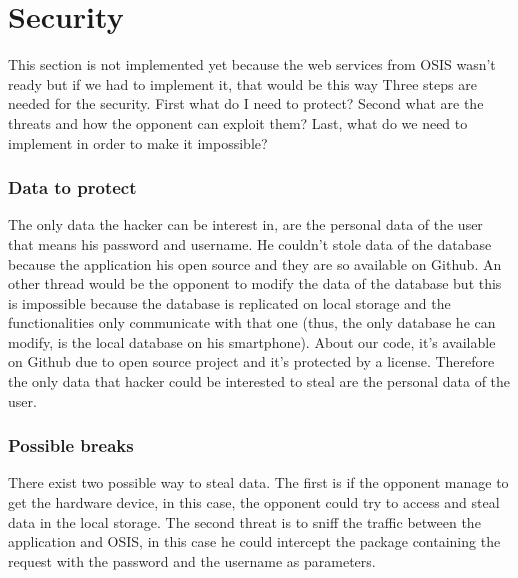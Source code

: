 \documentclass[11pt, a4paper]{report}
\begin{document}
\section{Security}

This section is not implemented yet because the web services from OSIS wasn't ready but if we had to implement it, that would be this way
Three steps are needed for the security. First what do I need to protect? Second what are the threats and how the opponent can exploit them? Last, what do we need to implement in order to make it impossible? 

\subsubsection{Data to protect}
The only data the hacker can be interest in, are the personal data of the user that means his password and username. He couldn't stole data of the database because the application his open source and they are so available on Github. An other thread would be the opponent to modify the data of the database but this is impossible because the database is replicated on local storage and the functionalities only communicate with that one (thus, the only database he can modify, is the local database on his smartphone). About our code, it's available on Github due to open source project and it's protected by a license. Therefore the only data that hacker could be interested to steal are the personal data of the user.

\subsubsection{Possible breaks}
There exist two possible way to steal data. The first is if the opponent manage to get the hardware device, in this case, the opponent could try to access and steal data in the local storage. The second threat is to sniff the traffic between the application and OSIS, in this case he could intercept the package containing the request with the password and the username as parameters. 
\end{document}
